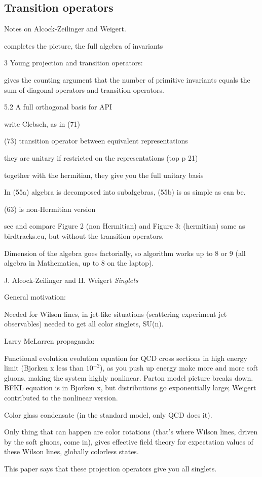 \subsection{Transition operators}
\label{s-AlcZei16-3}

Notes on Alcock-Zeilinger and Weigert.


completes the picture, the full algebra of invariants

3 Young projection and transition operators:

gives the counting argument that the number of primitive invariants
equals the sum of diagonal operators and transition operators.

5.2 A full orthogonal basis for API

write Clebsch, as in (71)

(73) transition operator between equivalent representations

they are unitary if restricted on the representations (top p 21)

together with the hermitian, they give you the full unitary basis

In (55a) algebra is decomposed into subalgebras, (55b) is as simple as can be.

(63) is non-Hermitian version

see and compare Figure 2 (non Hermitian) and Figure 3: (hermitian)
same as birdtracks.eu, but without the transition operators.

Dimension of the algebra goes factorially, so algorithm works up to 8 or 9
(all algebra in Mathematica, up to 8 on the laptop).


J. Alcock-Zeilinger and H. Weigert
{\em Singlets}

General motivation:

Needed for Wilson lines, in jet-like situations
(scattering experiment jet observables) needed to get all color singlets, SU(n).

Larry McLarren propaganda:

Functional evolution evolution equation  for QCD cross sections in high
energy limit (Bjorken x less than $10^{-2}$), as you push up energy make more
and more soft gluons, making the system highly nonlinear. Parton model
picture breaks down. BFKL equation is in Bjorken x, but distributions go
exponentially large; Weigert contributed to the nonlinear version.

Color glass condensate (in the standard model, only QCD does it).

Only thing that can happen are color rotations (that's where Wilson lines,
driven by the soft gluons, come in),
gives effective field theory for expectation values of these Wilson lines,
globally colorless states.

This paper says that these projection operators give you all singlets.
